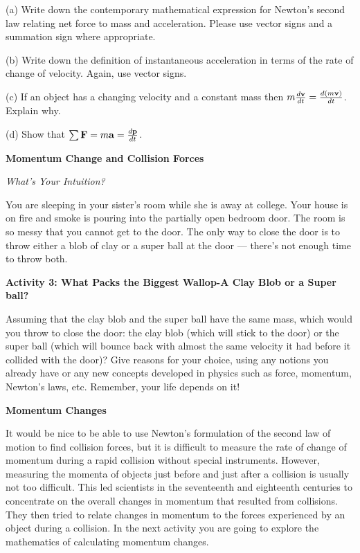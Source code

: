 (a) Write down the contemporary mathematical expression for Newton's second
law relating net force to mass and acceleration. Please use vector signs and
a summation sign where appropriate.
\vspace{10mm}

(b) Write down the definition of instantaneous acceleration in terms of the
rate of change of velocity. Again, use vector signs.
\vspace{10mm}

(c) If an object has a changing velocity and a constant
mass then \( m\frac{d{\bf v}}{dt}=\frac{d\left( m{\bf v}\right) }{dt} \).
Explain why.
\vspace{20mm}

(d) Show that \( \sum {\bf F}=m{\bf a}=\frac{d{\bf p}}{dt} \).
\vspace{20mm}


\textbf{Momentum Change and Collision Forces} 

\textit{What's Your Intuition?} 

You are sleeping in your sister's room while she is away at college. Your house
is on fire and smoke is pouring into the partially open bedroom door. The room
is so messy that you cannot get to the door. The only way to close the door
is to throw either a blob of clay or a super ball at the door --- 
there's not enough time to throw both.

\textbf{Activity 3: What Packs the Biggest Wallop-A Clay Blob or a Super ball? }

Assuming that the clay blob and the super ball have the same mass, which would
you throw to close the door: the clay blob (which will stick to the door) or
the super ball (which will bounce back with almost the same velocity it had
before it collided with the door)? Give reasons for your choice, using any notions
you already have or any new concepts developed in physics such as force, momentum,
Newton's laws, etc. Remember, your life depends on it!
\vspace{30mm}

\textbf{Momentum Changes} 

It would be nice to be able to use Newton's formulation of the second law of
motion to find collision forces, but it is difficult to measure the rate of
change of momentum during a rapid collision without special instruments. However,
measuring the momenta of objects just before and just after a collision is usually
not too difficult. This led scientists in the seventeenth and eighteenth centuries
to concentrate on the overall changes in momentum that resulted from collisions.
They then tried to relate changes in momentum to the forces experienced by an
object during a collision. In the next activity you are going to explore the
mathematics of calculating momentum changes.

